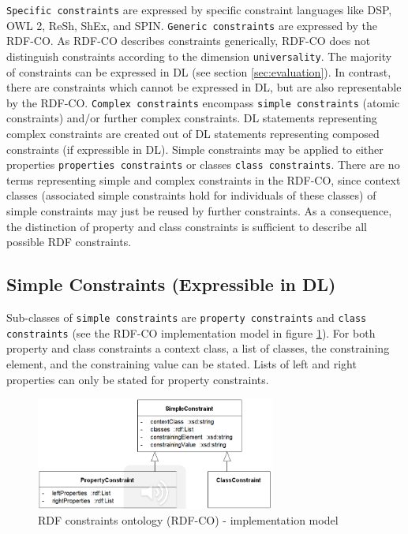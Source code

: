 \documentclass{llncs}
\newcommand{\ms}[1]{\texttt{#1}}
\begin{document}
\ms{Specific constraints} are expressed by specific constraint languages like DSP, OWL 2, ReSh, ShEx, and SPIN.
\ms{Generic constraints} are expressed by the RDF-CO.
As RDF-CO describes constraints generically, RDF-CO does not distinguish constraints according to the dimension \ms{universality}. 
The majority of constraints can be expressed in DL (see section \ref{sec:evaluation}).
In contrast, there are constraints which cannot be expressed in DL, but are also representable by the RDF-CO. 
\ms{Complex constraints} encompass \ms{simple constraints} (atomic constraints) and/or further complex constraints.
DL statements representing complex constraints are created out of DL statements representing composed constraints (if expressible in DL). 
Simple constraints may be applied to either properties \ms{properties constraints} or classes \ms{class constraints}.
There are no terms representing simple and complex constraints in the RDF-CO, since context classes (associated simple constraints hold for individuals of these classes) of simple constraints may just be reused by further constraints.
As a consequence, the distinction of property and class constraints is sufficient to describe all possible RDF constraints.

\subsection{Simple Constraints (Expressible in DL)}

Sub-classes of \ms{simple constraints} are \ms{property constraints} and \ms{class constraints} (see the RDF-CO implementation model in figure \ref{fig:RDF-CO-implementation-model}). 
For both property and class constraints a context class, a list of classes, the constraining element, and the constraining value can be stated. 
Lists of left and right properties can only be stated for property constraints.

\begin{figure}
	\centering
		\includegraphics[width=0.70\textwidth]{images/RDF-CO-implementation-model.png}
	\caption{RDF constraints ontology (RDF-CO) - implementation model}
	\label{fig:RDF-CO-implementation-model}
\end{figure}
\end{document}

